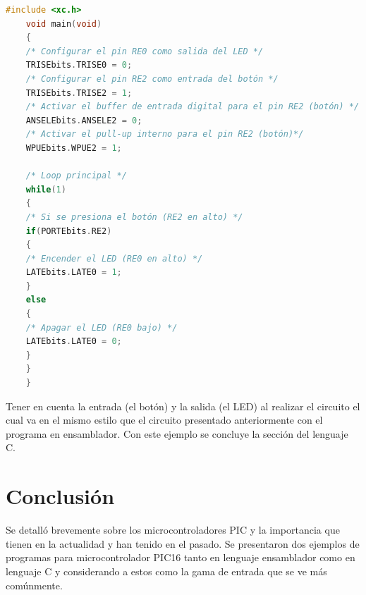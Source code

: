 \documentclass[conference]{IEEEtran}
\begin{document}
    \begin{lstlisting}[language=C, caption=Encender el LED al presionar el botón (con unión de bit)]
    #include <xc.h>
    void main(void)
    {
    /* Configurar el pin RE0 como salida del LED */
    TRISEbits.TRISE0 = 0;
    /* Configurar el pin RE2 como entrada del botón */
    TRISEbits.TRISE2 = 1;
    /* Activar el buffer de entrada digital para el pin RE2 (botón) */
    ANSELEbits.ANSELE2 = 0;
    /* Activar el pull-up interno para el pin RE2 (botón)*/
    WPUEbits.WPUE2 = 1;

    /* Loop principal */
    while(1)
    {
    /* Si se presiona el botón (RE2 en alto) */
    if(PORTEbits.RE2)
    {
    /* Encender el LED (RE0 en alto) */
    LATEbits.LATE0 = 1;
    }
    else
    {
    /* Apagar el LED (RE0 bajo) */
    LATEbits.LATE0 = 0;
    }
    }
    }
\end{lstlisting}

Tener en cuenta la entrada (el botón) y la salida (el LED) al realizar el circuito el cual va en el mismo estilo que el circuito presentado anteriormente con el programa en ensamblador. Con este ejemplo se concluye la sección del lenguaje C.

\section{Conclusión}

Se detalló brevemente sobre los microcontroladores PIC y la importancia que tienen en la actualidad y han tenido en el pasado. Se presentaron dos ejemplos de programas para microcontrolador PIC16 tanto en lenguaje ensamblador como en lenguaje C y considerando a estos como la gama de entrada que se ve más comúnmente.

\printbibliography
\end{document}
